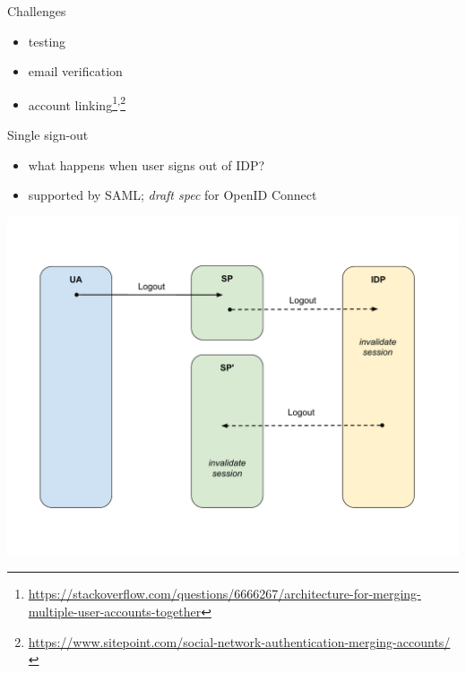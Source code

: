 \documentclass[ignorenonframetext,aspectratio=169]{beamer}
\providecommand{\tightlist}{%
  \setlength{\itemsep}{0pt}\setlength{\parskip}{0pt}}
\begin{document}
\begin{frame}{Challenges}

\begin{itemize}
\tightlist
\item testing
\item email verification
\item account linking\footnote{
        \url{https://stackoverflow.com/questions/6666267/architecture-for-merging-multiple-user-accounts-together}
    }\textsuperscript{,}\footnote{
        \url{https://www.sitepoint.com/social-network-authentication-merging-accounts/}
    }
\end{itemize}
\end{frame}

\begin{frame}{Single sign-out}
\begin{itemize}
\tightlist
\item what happens when user signs out of IDP?
\item supported by SAML; {\em draft spec} for OpenID Connect
\end{itemize}
\end{frame}

\begin{frame}[plain]
\centering
\includegraphics[height=\paperheight]{fedsso-logout-backchannel.pdf}
\end{frame}
\end{document}
